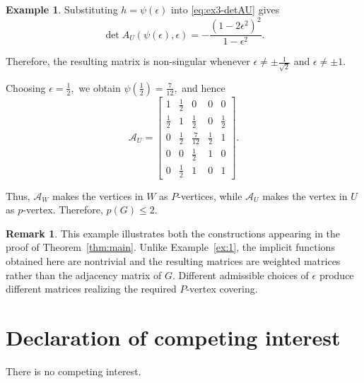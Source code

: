 \documentclass[12pt,reqno]{amsart}
\theoremstyle{plain}
\theoremstyle{definition}
\newtheorem{example}{Example}
\newtheorem{rem}{Remark}
\theoremstyle{block}
\theoremstyle{remark}
\numberwithin{equation}{section}
\begin{document}
\begin{example}
Substituting \(h=\psi(\epsilon)\) into \eqref{eq:ex3-detAU} gives
\[
\det A_U(\psi(\epsilon),\epsilon)
=
-\frac{(1-2\epsilon^2)^2}{1-\epsilon^2}.
\]

Therefore, the resulting matrix is non-singular whenever
\(
\epsilon\neq\pm\frac{1}{\sqrt2}
\)
and
\(
\epsilon\neq\pm1.
\)

Choosing
\(
\epsilon=\frac12,
\)
we obtain
\(
\psi\left(\frac12\right)=\frac7{12},
\)
and hence
\[
\mathcal A_U
=
\begin{bmatrix}
1&\frac12&0&0&0\\
\frac12&1&\frac12&0&\frac12\\
0&\frac12&\frac7{12}&\frac12&1\\
0&0&\frac12&1&0\\
0&\frac12&1&0&1
\end{bmatrix}.
\]

Thus, \(\mathcal A_W\) makes the vertices in \(W\) as \(P\)-vertices, while
\(\mathcal A_U\) makes the vertex in \(U\) as \(p\)-vertex. Therefore,
\(
p(G)\leq2.
\)

\end{example}
\begin{rem}
    This example illustrates both the constructions appearing in the proof of
Theorem~\ref{thm:main}. Unlike Example~\ref{ex:1}, the implicit
functions obtained here are nontrivial and the resulting matrices are
weighted matrices rather than the adjacency matrix of \(G\). Different
admissible choices of \(\epsilon\) produce different matrices realizing
the required \(P\)-vertex covering.
\end{rem}


\section*{Declaration of competing interest}
There is no competing interest.
\end{document}
